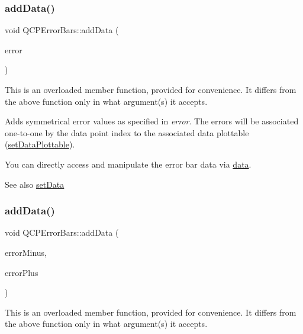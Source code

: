 \subsubsection{\texorpdfstring{addData()}{addData()}\hspace{0.1cm}{\footnotesize\ttfamily [1/4]}}
{\footnotesize\ttfamily void Q\+C\+P\+Error\+Bars\+::add\+Data (\begin{DoxyParamCaption}\item[{const Q\+Vector$<$ double $>$ \&}]{error }\end{DoxyParamCaption})}

This is an overloaded member function, provided for convenience. It differs from the above function only in what argument(s) it accepts.

Adds symmetrical error values as specified in {\itshape error}. The errors will be associated one-\/to-\/one by the data point index to the associated data plottable (\mbox{\hyperlink{class_q_c_p_error_bars_aabb42a964cfbf780cd1c79850c7cd989}{set\+Data\+Plottable}}).

You can directly access and manipulate the error bar data via \mbox{\hyperlink{class_q_c_p_error_bars_aeebd1b14f4c3573565efafd514988813}{data}}.

\begin{DoxySeeAlso}{See also}
\mbox{\hyperlink{class_q_c_p_error_bars_a92b1980003255f5f7c05407a4d92aabc}{set\+Data}} 
\end{DoxySeeAlso}
\mbox{\label{class_q_c_p_error_bars_a2135cf41d7925a3dcdadd4eb03fd3eb6}} 
\subsubsection{\texorpdfstring{addData()}{addData()}\hspace{0.1cm}{\footnotesize\ttfamily [2/4]}}
{\footnotesize\ttfamily void Q\+C\+P\+Error\+Bars\+::add\+Data (\begin{DoxyParamCaption}\item[{const Q\+Vector$<$ double $>$ \&}]{error\+Minus,  }\item[{const Q\+Vector$<$ double $>$ \&}]{error\+Plus }\end{DoxyParamCaption})}

This is an overloaded member function, provided for convenience. It differs from the above function only in what argument(s) it accepts.

